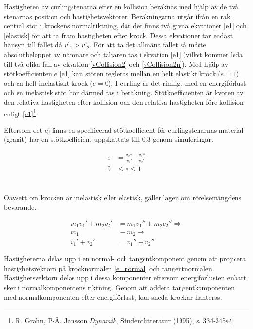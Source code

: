 \documentclass[11pt]{article} %
\begin{document}
Hastigheten av curlingstenarna efter en kollision beräknas med hjälp av de två stenarnas position och hastighetsvektorer.
Beräkningarna utgår ifrån en rak central stöt i krockens normalriktning, där det finns två givna ekvationer \eqref{e1} och \eqref{elastisk} för att ta fram hastigheten efter krock.  Dessa ekvationer tar endast hänsyn till fallet då $v’_1 > v’_2$. För att ta det allmäna fallet så måste absolutbeloppet av nämnare och täljaren tas i ekvation \eqref{e1} (vilket kommer leda till två olika fall av ekvation \eqref{vCollision2}  och \eqref{vCollision2n}). 
Med hjälp av stötkoefficienten $e$ \eqref{e1} kan stöten regleras mellan en helt elastikt krock ($e=1$) och en helt inelastiskt krock ($e=0$). 
I curling är det rimligt med en energiförlust och en inelastisk stöt bör därmed tas i beräkning. 
Stötkoefficienten är kvoten av den relativa hastigheten efter kollision och den relativa hastigheten före kollision enligt \eqref{e1}\footnote{R. Grahn, P-Å. Jansson \emph{Dynamik}, Studentlitteratur (1995), s. 334-345}.

Eftersom det ej finns en specificerad stötkoefficient för curlingstenarnas material (granit) har en stötkoefficient uppskattats till 0.3 genom simuleringar.  

 \begin{subequations}\label{e1}
 \begin{align}
 e& = \frac{v_2''-v_1''}{v_1'-v_2'}\\
0& \le e \le 1
 \end{align}
 \end{subequations}
\\\\Oavsett om krocken är inelastisk eller elastisk, gäller lagen om rörelsemängdens bevarande.

 \begin{subequations}\label{elastisk}
 \begin{align}
m_1 v_1' + m_2 v_2'& = m_1 v_1'' + m_2 v_2'' \Rightarrow\\
m_1& = m_2 \Rightarrow\\
v_1' + v_2'& = v_1'' + v_2'' \label{momentum}
 \end{align}
 \end{subequations}


Hastigheterna delas upp i en normal- och tangentkomponent genom att projicera hastighetsvektorn på krocknormalen \eqref{e_normal} och tangentnormalen. Hastighetsvektorn delas upp i dessa komponenter eftersom energiförlusten enbart sker i normalkomponentens riktning. Genom att addera tangentkomponenten med normalkomponenten efter energiförlust, kan sneda krockar hanteras.
\end{document}

